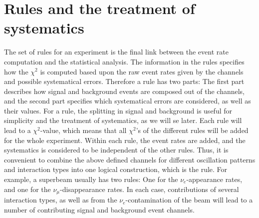 
\section{Rules and the treatment of systematics}
\label{sec:rules}

The set of rules for an experiment is the final 
link between the event rate computation and the statistical analysis. 
The information in the rules
specifies how the $\chi^2$ is computed based upon the raw event rates 
given by the channels and possible systematical errors. 
Therefore a rule has two parts: The first part describes how signal and 
background events are composed out of the channels, and the second part
specifies which systematical errors are considered, as well as their values.
%
For a rule, the splitting
in signal and background is useful for simplicity and the treatment of systematics, as we will se later. Each rule will lead to a $\chi^2$-value,
which means that all $\chi^2$'s of the different rules will be added
for the whole experiment. Within each rule, the event rates are added, and
the systematics is considered to be independent of the other rules.
Thus, it is convenient to combine the above defined channels for different
oscillation patterns and interaction types into one logical construction,
which is the rule. For example, a superbeam usually has two rules: One for
the $\nu_e$-appearance rates, and one for the $\nu_\mu$-disappearance rates.
 In each case, contributions of several interaction types, as well as from
 the $\nu_e$-contamination of the beam will lead to a number of contributing signal and background event channels.

